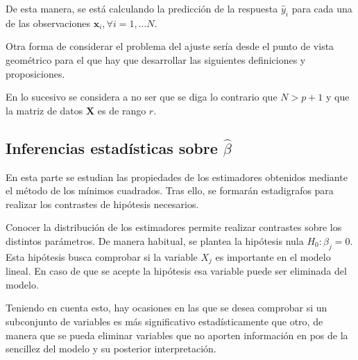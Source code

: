 \noindent De esta manera, se está calculando la predicción de la respuesta $\hat{y}_i$ para cada una de las observaciones $\mathbf{x}_i, \forall i =1, \ldots N$. 

\noindent Otra forma de considerar el problema del ajuste sería desde el punto de vista geométrico para el que hay que desarrollar las siguientes definiciones y proposiciones.

\noindent En lo sucesivo se considera a no ser que se diga lo contrario que $N>p+1$ y que la matriz de datos $\mathbf{X}$ es de rango $r$.


\subsection{Inferencias estadísticas sobre $\hat{\beta}$}

\noindent En esta parte se estudian las propiedades de los estimadores obtenidos mediante el método de los mínimos cuadrados. Tras ello, se formarán estadigrafos para realizar los contrastes de hipótesis necesarios.

\noindent Conocer la distribución de los estimadores permite realizar contrastes sobre los distintos parámetros. De manera habitual, se plantea la hipótesis nula $H_0: \beta_j=0 $. Esta hipótesis busca comprobar si la variable $X_j$ es importante en el modelo lineal. En caso de que se acepte la hipótesis esa variable puede ser eliminada del modelo. 

\noindent Teniendo en cuenta esto,  hay ocasiones en las que se desea comprobar si un subconjunto de variables es más significativo estadísticamente que otro, de manera que se pueda eliminar variables que no aporten información en pos de la sencillez del modelo y su posterior interpretación. 


